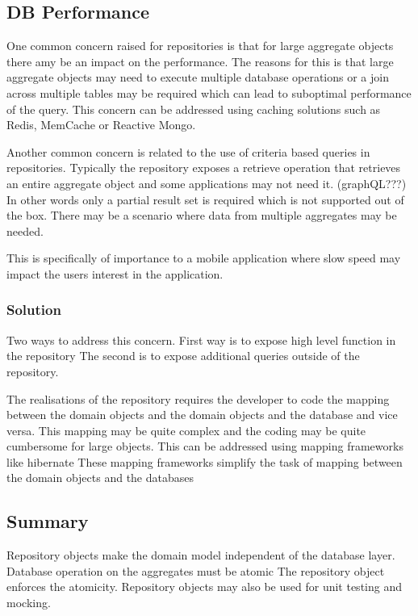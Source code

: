 \subsection{DB Performance}
One common concern raised for repositories is that for large aggregate objects there amy be an impact on the performance.
The reasons for this is that large aggregate objects may need to execute multiple database operations or a join across multiple tables may be required which can lead to suboptimal performance of the query.
This concern can be addressed using caching solutions such as Redis, MemCache or Reactive Mongo.

Another common concern is related to the use of criteria based queries in repositories.
Typically the repository exposes a retrieve operation that retrieves an entire aggregate object and some applications may not need it. (graphQL???)
In other words only a partial result set is required which is not supported out of the box.
There may be a scenario where data from multiple aggregates may be needed.
\begin{note}
    This is specifically of importance to a mobile application where slow speed may impact the users interest in the application.
\end{note}

\subsubsection{Solution}
Two ways to address this concern.
First way is to expose high level function in the repository
The second is to expose additional queries outside of the repository.

The realisations of the repository requires the developer to code the mapping between the domain objects and the domain objects and the database and vice versa.
This mapping may be quite complex and the coding may be quite cumbersome for large objects.
This can be addressed using mapping frameworks like hibernate
These mapping frameworks simplify the task of mapping between the domain objects and the databases

\subsection{Summary}
Repository objects make the domain model independent of the database layer.
Database operation on the aggregates must be atomic
The repository object enforces the atomicity.
Repository objects may also be used for unit testing and mocking.

